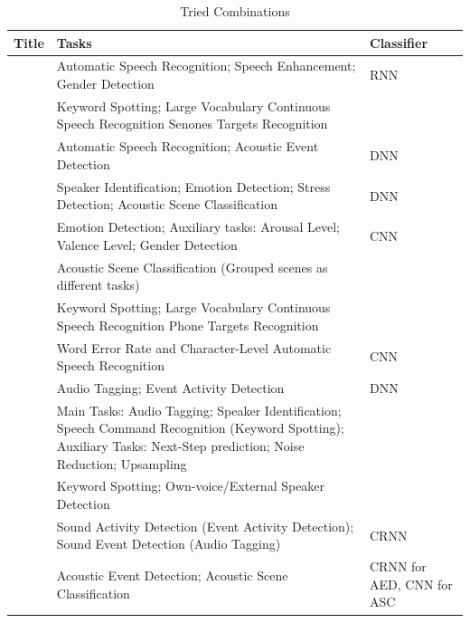 	\begin{table}[ht]
		\caption{Tried Combinations} %
		\centering %
		\begin{tabular}{p{}p{}p{}} %
			\hline\hline %
			Title & Tasks & Classifier   \\ [0.5ex] %
			\hline %
			\citet{lu2004multitask} & Automatic Speech Recognition; Speech Enhancement; Gender Detection & RNN \\ \hline
			\citet{panchapagesan2016multi} & Keyword Spotting; Large Vocabulary Continuous Speech Recognition Senones Targets Recognition & \\ \hline
			\citet{sakti2016deep} & Automatic Speech Recognition; Acoustic Event Detection & DNN \\ \hline
			\citet{georgiev2017heterogeneous} \citet{georgiev2017low} & Speaker Identification; Emotion Detection; Stress Detection; Acoustic Scene Classification & DNN \\ \hline
			\citet{kim2017speech} & Emotion Detection; Auxiliary tasks: Arousal Level; Valence Level; Gender Detection & CNN \\ \hline
			\citet{nwe2017convolutional} & Acoustic Scene Classification (Grouped scenes as different tasks) & \\ \hline
			\citet{sun2017compressed} & Keyword Spotting; Large Vocabulary Continuous Speech Recognition Phone Targets Recognition & \\ \hline
			\citet{kremer2018inductive} & Word Error Rate and Character-Level Automatic Speech Recognition & CNN \\ \hline
			\citet{morfi2018deep} & Audio Tagging; Event Activity Detection & DNN \\ \hline
			\citet{lee2019label} & Main Tasks: Audio Tagging; Speaker Identification; Speech Command Recognition (Keyword Spotting); Auxiliary Tasks: Next-Step prediction; Noise Reduction; Upsampling &  \\ \hline
			\citet{lopez2019keyword} & Keyword Spotting; Own-voice/External Speaker Detection & \\ \hline
			\citet{pankajakshan2019polyphonic} & Sound Activity Detection (Event Activity Detection); Sound Event Detection (Audio Tagging) & CRNN \\ \hline
			\citet{tonami2019joint} & Acoustic Event Detection; Acoustic Scene Classification & CRNN for AED, CNN for ASC  \\ \hline
		\end{tabular}
		\label{table:combinations} %
	\end{table}

